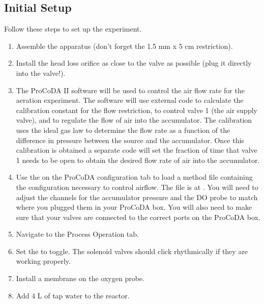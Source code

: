 \documentclass[letterpaper,10pt,english]{sphinxmanual}
\begin{document}
\subsection{Initial Setup}
\label{\detokenize{Gas_Transfer/Gas_Transfer:initial-setup}}
Follow these steps to set up the experiment.
\begin{enumerate}
\item {} 
Assemble the apparatus (don’t forget the 1.5 mm x 5 cm restriction).

\item {} 
Install the head loss orifice as close to the valve as possible (plug it directly into the valve!).

\item {} 
The ProCoDA II software will be used to control the air flow rate for the aeration experiment. The software will use external code to calculate the calibration constant for the flow restriction, to control valve 1 (the air supply valve), and to regulate the flow of air into the accumulator. The calibration uses the ideal gas law to determine the flow rate as a function of the difference in pressure between the source and the accumulator. Once this calibration is obtained a separate code will set the fraction of time that valve 1 needs to be open to obtain the desired flow rate of air into the accumulator.

\item {} 
Use the  on the ProCoDA configuration tab to load a method file containing the configuration necessary to control airflow. The file is at . You will need to adjust the channels for the accumulator pressure and the DO probe to match where you plugged them in your ProCoDA box. You will also need to make sure that your valves are connected to the correct ports on the ProCoDA box.

\item {} 
Navigate to the Process Operation tab.

\item {} 
Set the  to toggle.  The solenoid valves should click rhythmically if they are working properly.

\item {} 
Install a membrane on the oxygen probe.

\item {} 
Add 4 L of tap water to the reactor.


\end{enumerate}
\end{document}
